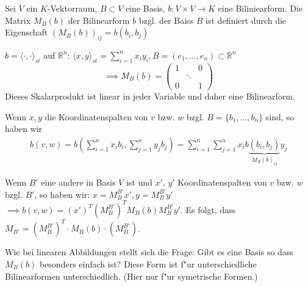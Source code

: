 \documentclass[oneside,fontsize=11pt,paper=a4,BCOR=0mm,DIV=12,automark,headsepline]{scrbook}
\newcommand{\gq}[1]{\glqq{}#1\grqq{}} %
\theoremstyle{remark}
\theoremstyle{definition}
\theoremstyle{definition}
\theoremstyle{remark}
\begin{document}
\begin{definition}{}{}
  Sei $V$ ein $K$-Vektorraum, $B\subset V$ eine Basis, \(b: V\times V\to K\) eine Biliniearform.
  Die Matrix $M_B(b)$ der Bilinearform $b$ bzgl. der Baiss $B$ ist definiert
  durch die Eigenschaft $(M_B(b))_{ij}=b(b_i, b_j)$
\end{definition}
\begin{exa}
  \(b = \langle\cdot , \cdot\rangle_{st}\) auf \(\mathbb{R}^n\): \(\langle x, y\rangle_{st} = \sum_{i=1}^nx_i y_i, B = (e_1, \dots, e_n)\subset \mathbb{R}^n\) \[\implies M_B(b) =
    \begin{pmatrix}
      1 & & 0 \\
      &\ddots & \\
      0 & & 1
    \end{pmatrix}
\] Dieses Skalarprodukt ist linear in jeder Variable und daher eine Bilinearform.
\end{exa}
Wenn $x,y$ die Koordinatenspalten von $v$ bzw. $w$ bzgl. $B = \{b_1,\dots, b_n\}$ sind, so haben wir
\begin{align*}
  b(v,w) = b\left(\sum_{i=1}^nx_ib_i, \sum_{j=1}^ny_jb_j\right) = \sum_{i=1}^n\sum_{j=1}^nx_ib\underbrace{(b_i, b_j)}_{M_B(b)_{ij}}y_j
\end{align*}

Wenn $B'$ eine andere in Basis $V$ ist und $x'$, $y'$ Koordinatenspalten von $v$
bzw. $w$ bzgl. $B'$, so haben wir: $x=M_{B}^{B'}x', y = M_{B}^{B'}y'$  $\implies b(v,w)= (x')^T(M_B^{B'})^TM_B(b)M_B^{B'}y'$. Es
folgt, dass $M_{B'}= (M^{B'}_{B})^T\cdot M_B(b)\cdot (M^{B'}_{B})$.

Wie bei linearen Abbildungen stellt sich die Frage: \gq{Gibt es eine Basis so dass
$M_B(b)$ besonders einfach ist?} Diese Form ist f"ur unterschiedliche
Bilinearformen unterschiedlich. (Hier nur f"ur symetrische Formen.)
\end{document}
